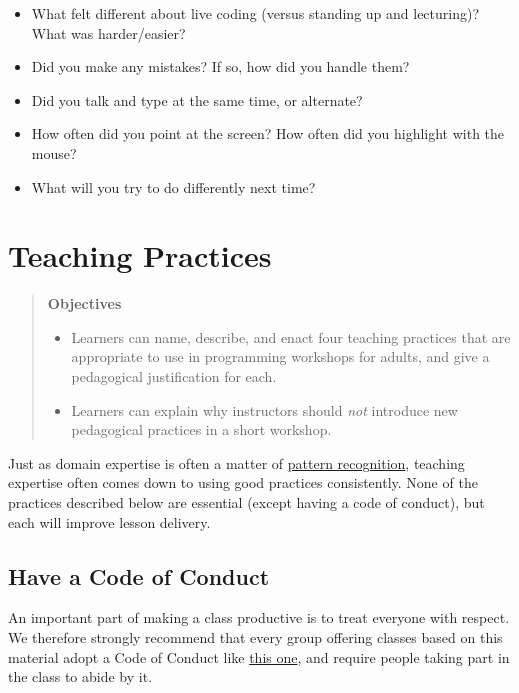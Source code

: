 \documentclass[10pt,statementpaper]{memoir}
\providecommand{\tightlist}{%
  \setlength{\itemsep}{0pt}\setlength{\parskip}{0pt}}
\begin{document}
\begin{itemize}
\item
  What felt different about live coding (versus standing up and
  lecturing)? What was harder/easier?
\item
  Did you make any mistakes? If so, how did you handle them?
\item
  Did you talk and type at the same time, or alternate?
\item
  How often did you point at the screen? How often did you highlight
  with the mouse?
\item
  What will you try to do differently next time?
\end{itemize}

\chapter{Teaching Practices}\label{teaching-practices-2}

\begin{quote}
\textbf{Objectives}

\begin{itemize}
\tightlist
\item
  Learners can name, describe, and enact four teaching practices that
  are appropriate to use in programming workshops for adults, and give a
  pedagogical justification for each.
\item
  Learners can explain why instructors should \emph{not} introduce new
  pedagogical practices in a short workshop.
\end{itemize}
\end{quote}

Just as domain expertise is often a matter of
\href{load.html\#pattern-recognition}{pattern recognition}, teaching
expertise often comes down to using good practices consistently. None of
the practices described below are essential (except having a code of
conduct), but each will improve lesson delivery.

\section{Have a Code of Conduct}\label{have-a-code-of-conduct}

An important part of making a class productive is to treat everyone with
respect. We therefore strongly recommend that every group offering
classes based on this material adopt a Code of Conduct like
\href{conduct.html}{this one}, and require people taking part in the
class to abide by it.
\end{document}
